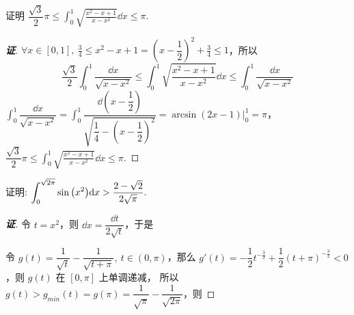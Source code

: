 \begin{example}
    证明 $\displaystyle\dfrac{\sqrt{3}}{2}\pi\leqslant \int_{0}^{1}\sqrt{\frac{x^2-x+1}{x-x^2}}\dd x\leqslant \pi.$
\end{example}
\begin{proof}[{\songti \textbf{证}}]
    $\displaystyle\forall x\in[0,1],~\frac{3}{4}\leqslant x^2-x+1=\left(x-\dfrac{1}{2}\right)^2+\frac{3}{4}\leqslant 1$，所以
    $$\dfrac{\sqrt{3}}{2}\int _{0}^{1}\dfrac{\dd x}{\sqrt{x-x^{2}}}\leqslant \int _{0}^{1}\sqrt{\dfrac{x^{2}-x+1}{x-x^{2}}}\dd x\leqslant \int _{0}^{1}\dfrac{\dd x}{\sqrt{x-x^{2}}}$$
    $\displaystyle \int _{0}^{1}\dfrac{\dd x}{\sqrt{x-x^{2}}}=\int _{0}^{1}\dfrac{\dd \left( x-\dfrac{1}{2}\right) }{\sqrt{\dfrac{1}{4}-\left( x-\dfrac{1}{2}\right)^2}}=\arcsin \left( 2x-1\right)\bigg |_0^1=\pi $，
    $\displaystyle \dfrac{\sqrt{3}}{2}\pi\leqslant \int_{0}^{1}\sqrt{\frac{x^2-x+1}{x-x^2}}\dd x\leqslant \pi.$
\end{proof}

\begin{example}
    证明: $\displaystyle \int_{0}^{\sqrt{2\pi}}\sin\qty(x^2)\dd x>\dfrac{2-\sqrt{2}}{2\sqrt{\pi}}.$
\end{example}
\begin{proof}[{\songti \textbf{证}}]
    令 $t=x^2$，则 $\dd x=\dfrac{\dd t}{2\sqrt{t}}$，于是
    令 $g(t)=\dfrac{1}{\sqrt{t}}-\dfrac{1}{\sqrt{t+\pi}},~t\in(0,\pi)$，那么 $g'(t)=-\dfrac{1}{2}t^{-\frac{3}{2}}+\dfrac{1}{2}(t+\pi)^{-\frac{3}{2}}<0$，则 $g(t)$ 在 $[0,\pi]$ 上单调递减，
    所以 $g(t)>g_{min}(t)=g(\pi)=\dfrac{1}{\sqrt{\pi}}-\dfrac{1}{\sqrt{2\pi}}$，则
\end{proof}

